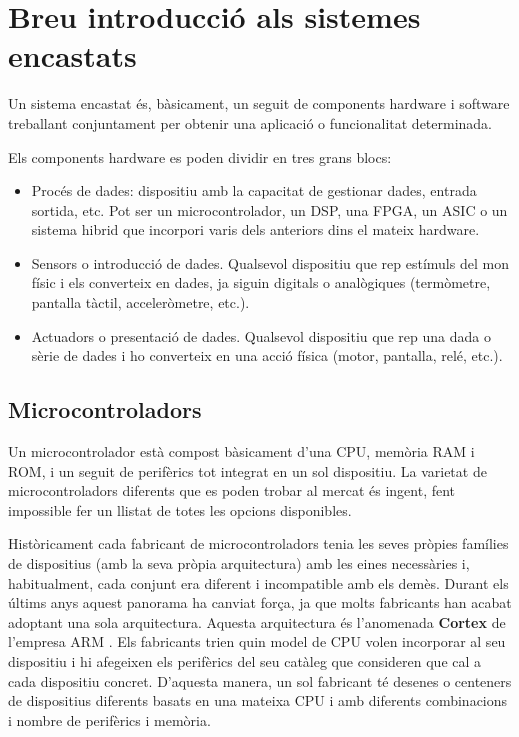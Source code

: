 
\chapter{Breu introducció als sistemes encastats}
\label{ch:components}

Un sistema encastat és, bàsicament, un seguit de components hardware i software treballant conjuntament per obtenir una aplicació o funcionalitat determinada.

Els components hardware es poden dividir en tres grans blocs:
\begin{itemize}
\item Procés de dades: dispositiu amb la capacitat de gestionar dades, entrada sortida, etc. Pot ser un microcontrolador, un \gls{DSP}, una \gls{FPGA}, un \gls{ASIC} o un sistema hibrid que incorpori varis dels anteriors dins el mateix hardware.
 \item Sensors o introducció de dades. Qualsevol dispositiu que rep estímuls del mon físic i els converteix en dades, ja siguin digitals o analògiques (termòmetre, pantalla tàctil, acceleròmetre, etc.).
 \item Actuadors o presentació de dades. Qualsevol dispositiu que rep una dada o sèrie de dades i ho converteix en una acció física (motor, pantalla, relé, etc.).
\end{itemize}


\section{Microcontroladors}
Un microcontrolador està compost bàsicament d'una \gls{CPU}, memòria \gls{RAM} i \gls{ROM}, i un seguit de perifèrics tot integrat en un sol dispositiu. La varietat de microcontroladors diferents que es poden trobar al mercat és ingent, fent impossible fer un llistat de totes les opcions disponibles.

Històricament cada fabricant de microcontroladors tenia les seves pròpies famílies de dispositius (amb la seva pròpia arquitectura) amb les eines necessàries i, habitualment, cada conjunt era diferent i incompatible amb els demès.
Durant els últims anys aquest panorama ha canviat força, ja que molts fabricants han acabat adoptant una sola arquitectura. Aquesta arquitectura és l'anomenada {\bf \gls{Cortex}} de l'empresa \gls{ARM} \cite{Cortex}. Els fabricants trien quin model de CPU volen incorporar al seu dispositiu i hi afegeixen els perifèrics del seu catàleg que consideren que cal a cada dispositiu concret. D'aquesta manera, un sol fabricant té desenes o centeners de dispositius diferents basats en una mateixa CPU i amb diferents combinacions i nombre de perifèrics i memòria.

